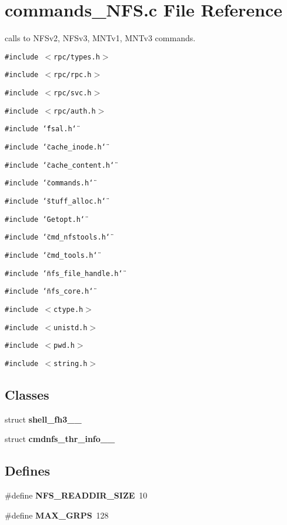\section{commands\_\-NFS.c File Reference}
\label{commands__NFS_8c}
calls to NFSv2, NFSv3, MNTv1, MNTv3 commands. 

{\tt \#include $<$rpc/types.h$>$}\par
{\tt \#include $<$rpc/rpc.h$>$}\par
{\tt \#include $<$rpc/svc.h$>$}\par
{\tt \#include $<$rpc/auth.h$>$}\par
{\tt \#include \char`\"{}fsal.h\char`\"{}}\par
{\tt \#include \char`\"{}cache\_\-inode.h\char`\"{}}\par
{\tt \#include \char`\"{}cache\_\-content.h\char`\"{}}\par
{\tt \#include \char`\"{}commands.h\char`\"{}}\par
{\tt \#include \char`\"{}stuff\_\-alloc.h\char`\"{}}\par
{\tt \#include \char`\"{}Getopt.h\char`\"{}}\par
{\tt \#include \char`\"{}cmd\_\-nfstools.h\char`\"{}}\par
{\tt \#include \char`\"{}cmd\_\-tools.h\char`\"{}}\par
{\tt \#include \char`\"{}nfs\_\-file\_\-handle.h\char`\"{}}\par
{\tt \#include \char`\"{}nfs\_\-core.h\char`\"{}}\par
{\tt \#include $<$ctype.h$>$}\par
{\tt \#include $<$unistd.h$>$}\par
{\tt \#include $<$pwd.h$>$}\par
{\tt \#include $<$string.h$>$}\par
\subsection*{Classes}
\begin{CompactItemize}
\item 
struct {\bf shell\_\-fh3\_\-\_\-}
\item 
struct {\bf cmdnfs\_\-thr\_\-info\_\-\_\-}
\end{CompactItemize}
\subsection*{Defines}
\begin{CompactItemize}
\item 
\#define {\bf NFS\_\-READDIR\_\-SIZE}\ 10
\item 
\#define {\bf MAX\_\-GRPS}\ 128
\end{CompactItemize}
